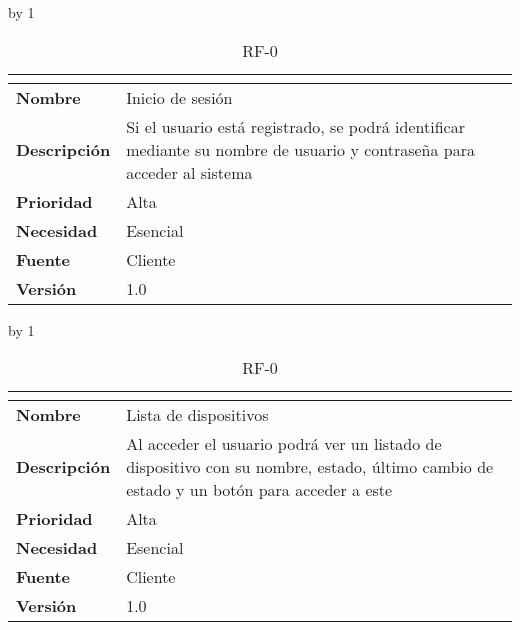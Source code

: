 \advance\rf by 1
\begin{table}[H]
	\caption{RF-0\number\rf}
	\begin{tabular}{|l|p{}|}
		\hline
		\multicolumn{2}{|c|}{\cellcolor[HTML]{BFBFBF}{\color[HTML]{000000} \textbf{RF-0\number\rf}}} \\ \hline
		\textbf{Nombre}      & Inicio de sesión                                                                                                       \\ \hline
		\textbf{Descripción} & Si el usuario está registrado, se podrá identificar mediante su nombre de usuario y contraseña para acceder al sistema \\ \hline
		\textbf{Prioridad}   & Alta                                                                                                                   \\ \hline
		\textbf{Necesidad}   & Esencial                                                                                                               \\ \hline
		\textbf{Fuente}      & Cliente                                                                                                                \\ \hline
		\textbf{Versión}     & 1.0                                                                                                                    \\ \hline
	\end{tabular}
\end{table}
\advance\rf by 1
\begin{table}[H]
	\caption{RF-0\number\rf}
	\begin{tabular}{|l|p{}|}
		\hline
		\multicolumn{2}{|c|}{\cellcolor[HTML]{BFBFBF}{\color[HTML]{000000} \textbf{RF-0\number\rf}}} \\ \hline
		\textbf{Nombre}      & Lista de dispositivos                                                                                                                   \\ \hline
		\textbf{Descripción} & Al acceder el usuario podrá ver un listado de dispositivo con su nombre, estado, último cambio de estado y un botón para acceder a este \\ \hline
		\textbf{Prioridad}   & Alta                                                                                                                                    \\ \hline
		\textbf{Necesidad}   & Esencial                                                                                                                                \\ \hline
		\textbf{Fuente}      & Cliente                                                                                                                                 \\ \hline
		\textbf{Versión}     & 1.0                                                                                                                                     \\ \hline
	\end{tabular}
\end{table}
